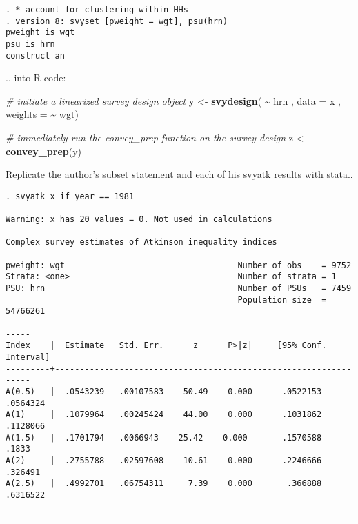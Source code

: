 \documentclass[
]{book}
\newenvironment{Shaded}{\begin{snugshade}}{\end{snugshade}}
\newcommand{\AttributeTok}[1]{\textcolor[rgb]{0.13,0.29,0.53}{#1}}
\newcommand{\CommentTok}[1]{\textcolor[rgb]{0.56,0.35,0.01}{\textit{#1}}}
\newcommand{\FunctionTok}[1]{\textcolor[rgb]{0.13,0.29,0.53}{\textbf{#1}}}
\newcommand{\NormalTok}[1]{#1}
\newcommand{\OtherTok}[1]{\textcolor[rgb]{0.56,0.35,0.01}{#1}}
\newcommand{\SpecialCharTok}[1]{\textcolor[rgb]{0.81,0.36,0.00}{\textbf{#1}}}
\begin{document}
\begin{verbatim}
. * account for clustering within HHs 
. version 8: svyset [pweight = wgt], psu(hrn)
pweight is wgt
psu is hrn
construct an
\end{verbatim}

.. into R code:

\begin{Shaded}
\begin{Highlighting}[]
\CommentTok{\# initiate a linearized survey design object}
\NormalTok{y }\OtherTok{\textless{}{-}} \FunctionTok{svydesign}\NormalTok{( }\SpecialCharTok{\textasciitilde{}}\NormalTok{ hrn , }\AttributeTok{data =}\NormalTok{ x , }\AttributeTok{weights =} \SpecialCharTok{\textasciitilde{}}\NormalTok{ wgt)}

\CommentTok{\# immediately run the \textasciigrave{}convey\_prep\textasciigrave{} function on the survey design}
\NormalTok{z }\OtherTok{\textless{}{-}} \FunctionTok{convey\_prep}\NormalTok{(y)}
\end{Highlighting}
\end{Shaded}

Replicate the author's subset statement and each of his svyatk results with stata..

\begin{verbatim}
. svyatk x if year == 1981
 
Warning: x has 20 values = 0. Not used in calculations

Complex survey estimates of Atkinson inequality indices
 
pweight: wgt                                   Number of obs    = 9752
Strata: <one>                                  Number of strata = 1
PSU: hrn                                       Number of PSUs   = 7459
                                               Population size  = 54766261
---------------------------------------------------------------------------
Index    |  Estimate   Std. Err.      z      P>|z|     [95% Conf. Interval]
---------+-----------------------------------------------------------------
A(0.5)   |  .0543239   .00107583    50.49    0.000      .0522153   .0564324
A(1)     |  .1079964   .00245424    44.00    0.000      .1031862   .1128066
A(1.5)   |  .1701794   .0066943    25.42    0.000       .1570588      .1833
A(2)     |  .2755788   .02597608    10.61    0.000      .2246666    .326491
A(2.5)   |  .4992701   .06754311     7.39    0.000       .366888   .6316522
---------------------------------------------------------------------------
\end{verbatim}
\end{document}
